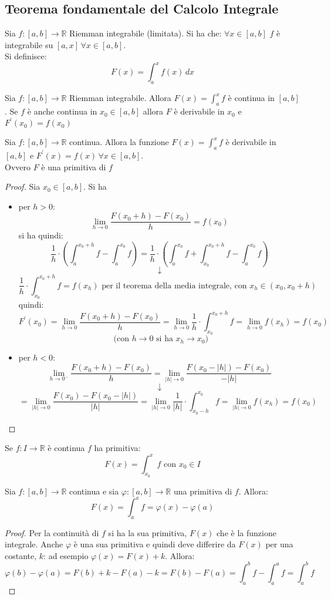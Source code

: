 \documentclass[a4paper,12pt, oneside]{book}
\begin{document}
\subsection{Teorema fondamentale del Calcolo Integrale}
\begin{teorema}
Sia $f:[a,b]\rightarrow\mathbb{R}$ Riemman integrabile (limitata). Si ha che:
$\forall x\in[a,b]$ $f$ è integrabile su $[a,x]\,\forall x\in[a,b]$.\\Si definisce:$$F(x)=\int_a^x f(x)\,dx$$ 
\end{teorema}
\begin{teorema}
Sia $f:[a,b]\rightarrow\mathbb{R}$ Riemman integrabile. Allora $F(x)=\int_a^x f$ è continua in $[a,b]$. Se $f$ è anche continua in $x_0\in[a,b]$ allora $F$ è derivabile in $x_0$ e $F^{'}(x_0)=f(x_0)$
\end{teorema}
\begin{teorema}
Sia $f:[a,b]\rightarrow\mathbb{R}$ continua. Allora la funzione $F(x)=\int_a^x f$ è derivabile in $[a,b]$ e $F^{'}(x)=f(x)\,\forall x\in[a,b]$.\\Ovvero $F$ è una primitiva di $f$
\end{teorema}
\begin{proof}
Sia $x_0\in[a,b]$. Si ha 
\begin{itemize}
\item per $h>0$:
$$\lim_{h\rightarrow 0}\frac{F(x_0+h)-F(x_0)}{h}=f(x_0)$$
si ha quindi:
$$\frac{1}{h}\cdot \left( \int_a^{x_0+h} f-\int_a^{x_0} f\right)=\frac{1}{h}\cdot \left( \int_a^{x_0}f+\int_{x_0}^{x_0+h}f-\int_a^{x_0} f \right)$$
$$\downarrow$$
$$\frac{1}{h}\cdot\int_{x_0}^{x_0+h}f=f(x_h)\mbox{ per il teorema della media integrale, con }x_h\in(x_0,x_0+h)$$
quindi:
$$F^{'}(x_0)=\lim_{h\rightarrow 0}\frac{F(x_0+h)-F(x_0)}{h}=\lim_{h\rightarrow 0}\frac{1}{h}\cdot\int_{x_0}^{x_0+h}f=\lim_{h\rightarrow 0} f(x_h)=f(x_0)$$
$$ \mbox{ (con } h\rightarrow 0 \mbox{ si ha }x_h\rightarrow x_0)$$
\item per $h<0$:
$$\lim_{h\rightarrow 0^{-}}\frac{F(x_0+h)-F(x_0)}{h}=\lim_{|h|\rightarrow 0}\frac{F(x_0-|h|)-F(x_0)}{-|h|}$$
$$\downarrow$$
$$=\lim_{|h|\rightarrow 0}\frac{F(x_0)-F(x_0-|h|)}{|h|}=\lim_{|h|\rightarrow 0}\frac{1}{|h|}\cdot\int_{x_0-h}^{x_0}f=\lim_{|h|\rightarrow 0}f(x_h)=f(x_0)$$
\end{itemize}
\end{proof}
\begin{corollario}
Se $f:I\rightarrow\mathbb{R}$ è continua $f$ ha primitiva: 
$$F(x)=\int_{x_0}^x f\mbox{ con } x_0\in I$$
\end{corollario}
\newpage
\begin{teorema}
Sia $f:[a,b]\rightarrow\mathbb{R}$ continua e sia $\varphi:[a,b]\rightarrow\mathbb{R}$ una primitiva di $f$. Allora:
$$F(x)=\int_a^x f=\varphi(x)-\varphi(a)$$
\end{teorema}
\begin{proof}
Per la continuità di $f$ si ha la sua primitiva, $F(x)$ che è la funzione integrale. Anche $\varphi$ è una sua primitiva e quindi deve differire da $F(x)$ per una costante, $k$: ad esempio $\varphi(x)=F(x)+k$. Allora:
$$ \varphi(b)-\varphi(a)=F(b)+k-F(a)-k=F(b)-F(a)=\int_a^b f-\int_a^af=\int_a^bf$$
\end{proof}
\end{document}
